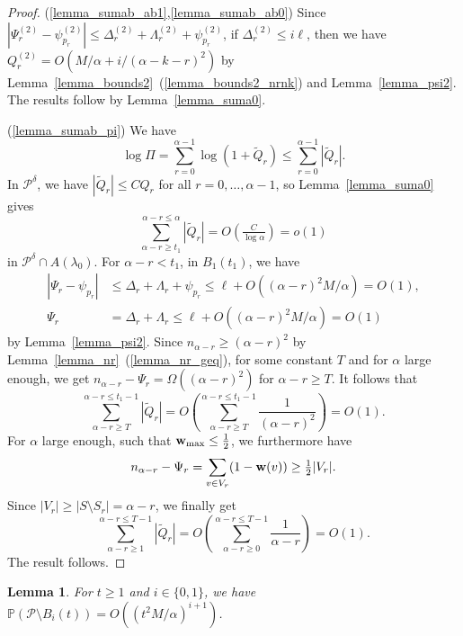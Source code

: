 \documentclass{article}
\theoremstyle{plain}
\theoremstyle{remark}
\theoremstyle{plain}
\newtheorem{lemma}[theorem]{Lemma}
\numberwithin{equation}{section}
\renewcommand{\b}{{\bf{w}}}
\begin{document}
	\begin{proof}
		(\ref{lemma_sumab_ab1},\ref{lemma_sumab_ab0}) Since $|\Psi_r^{(2)}-\psi_{p_r}^{(2)}|\leq\Delta_r^{(2)}+\Lambda_r^{(2)}+\psi_{p_r}^{(2)}$, if $\Delta_r^{(2)}\leq i\ell$, then we have $Q_r^{(2)}=O(M/\alpha+i/(\alpha-k-r)^2)$ by Lemma~\ref{lemma_bounds2}~(\ref{lemma_bounds2_nrnk}) and Lemma~\ref{lemma_psi2}. The results follow by Lemma~\ref{lemma_suma0}.
		
		(\ref{lemma_sumab_pi}) We have $$\log\Pi=\sum_{r=0}^{\alpha-1}\log(1+\widetilde{Q}_r)\leq\sum_{r=0}^{\alpha-1}|\widetilde{Q}_r|.$$ In $\mathcal{P}^{\delta}$, we have $|\widetilde{Q}_r|\leq CQ_r$ for all $r=0,\ldots,\alpha-1$, so Lemma~\ref{lemma_suma0} gives $$\sum_{\alpha-r\geq t_1}^{\alpha-r\leq\alpha}|\widetilde{Q}_r|=O\left(\tfrac{C}{\log\alpha}\right)=o(1)$$ in $\mathcal{P}^{\delta}\cap A(\lambda_0)$. For $\alpha-r<t_1$, in $B_1(t_1)$, we have
		\begin{align}
			|\Psi_r-\psi_{p_r}|&\leq\Delta_r+\Lambda_r+\psi_{p_r}\leq\ell+O((\alpha-r)^2M/\alpha)=O(1),
			\\\Psi_r&=\Delta_r+\Lambda_r\leq\ell+O((\alpha-r)^2M/\alpha)=O(1)
		\end{align}
		by Lemma~\ref{lemma_psi2}. Since $n_{\alpha-r}\geq(\alpha-r)^2$ by Lemma~\ref{lemma_nr}~(\ref{lemma_nr_geq}), for some constant $T$ and for $\alpha$ large enough, we get $n_{\alpha-r}-\Psi_r=\Omega((\alpha-r)^2)$ for $\alpha-r\geq T$. It follows that $$\sum_{\alpha-r\geq T}^{\alpha-r\leq t_1-1}|\widetilde{Q}_r|=O\left(\sum_{\alpha-r\geq T}^{\alpha-r\leq t_1-1}\frac{1}{(\alpha-r)^2}\right)=O(1).$$ For $\alpha$ large enough, such that $\b_{\max}\leq\tfrac12$, we furthermore have $$n_{\alpha-r}-\Psi_r=\sum_{v\in V_r}(1-\b(v))\geq\tfrac12|V_r|.$$ Since $|V_r|\geq|S\setminus S_r|=\alpha-r$, we finally get $$\sum_{\alpha-r\geq1}^{\alpha-r\leq T-1}|\widetilde{Q}_r|=O\left(\sum_{\alpha-r\geq 0}^{\alpha-r\leq T-1}\frac{1}{\alpha-r}\right)=O(1).$$ The result follows.
	\end{proof}
	
	\begin{lemma}\label{lemma_pb}
		For $t\geq1$ and $i\in\{0,1\}$, we have $\mathbb{P}(\mathcal{P}\setminus B_i(t))=O((t^2M/\alpha)^{i+1})$.
	\end{lemma}
	
\end{document}
